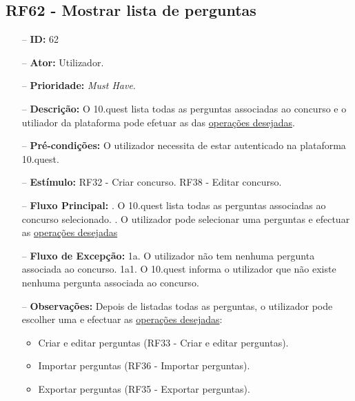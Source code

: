 \subsection{RF62 - Mostrar lista de perguntas}
\begin{itemize}
	\item[--] \textbf{ID:} 62
	\item[--]  \textbf{Ator:} Utilizador.
	\item[--]  \textbf{Prioridade:} \textit{Must Have}.
	\item[--]  \textbf{Descrição:} O 10.quest lista todas as perguntas associadas ao concurso e o utiliador da plataforma pode efetuar as das \underline{operações desejadas}.
	\item[--]  \textbf{Pré-condições:} O utilizador necessita de estar autenticado na plataforma 10.quest.
	\item[--]  \textbf{Estímulo:} 
	\subitem RF32 - Criar concurso.
	\subitem RF38 - Editar concurso.
	\item[--]  \textbf{Fluxo Principal:} 
	. O 10.quest lista todas as perguntas associadas ao concurso selecionado.
	. O utilizador pode selecionar uma perguntas e efectuar as \underline{operações desejadas}
	\item[--]  \textbf{Fluxo de Excepção:} 
	\subitem 1a. O utilizador não tem nenhuma pergunta associada ao concurso.
	\subitem 1a1. O 10.quest informa o utilizador que não existe nenhuma pergunta associada ao concurso.
	\item[--]  \textbf{Observações:} Depois de listadas todas as perguntas, o utilizador pode escolher uma e efectuar as \underline{operações desejadas}:
	\begin{itemize}
		\item Criar e editar perguntas (RF33 - Criar e editar perguntas).
		\item Importar perguntas (RF36 - Importar perguntas).
		\item Exportar perguntas (RF35 - Exportar perguntas).
	\end{itemize}
\end{itemize}
\newpage